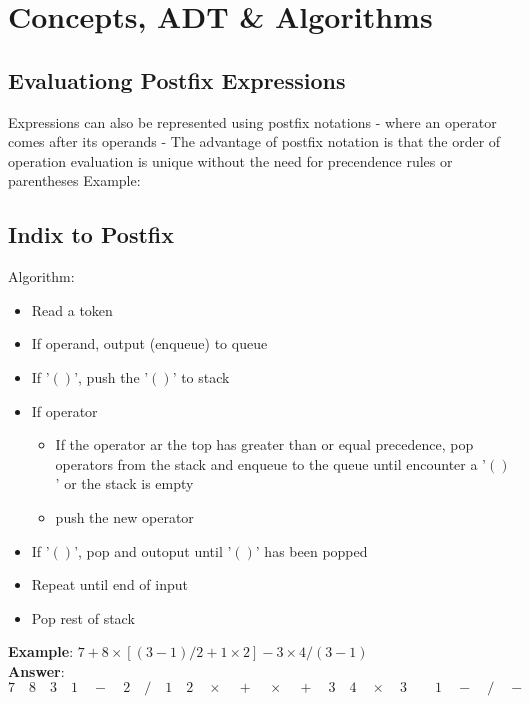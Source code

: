 \section{Concepts, ADT \& Algorithms}
\subsection{Evaluationg Postfix Expressions}
Expressions can also be represented using postfix notations - where an operator comes after its operands
- The advantage of postfix notation is that the order of operation evaluation is unique without the need for precendence rules or parentheses
Example:
\subsection{Indix to Postfix}
Algorithm:
\begin{itemize}
    \item Read a token
    \item If operand, output (enqueue) to queue
    \item If '$()$', push the '$()$' to stack
    \item If operator
    \begin{itemize}
        \item If the operator ar the top has greater than or equal precedence, pop operators from the stack and enqueue to the queue until encounter a '$()$' or the stack is empty
        \item push the new operator
    \end{itemize}
    \item If '$()$', pop and outoput until '$()$' has been popped
    \item Repeat until end of input
    \item Pop rest of stack
\end{itemize}
\textbf{Example}: $7 + 8 \times [(3 - 1) / 2 + 1 \times 2] - 3 \times 4 / (3 - 1)$\\
\textbf{Answer}: $7\quad8\quad3\quad1\quad-\quad2\quad/\quad1\quad2\quad\times\quad+\quad\times\quad+\quad3\quad4\quad\times\quad3\quad\quad1\quad-\quad/\quad-$














